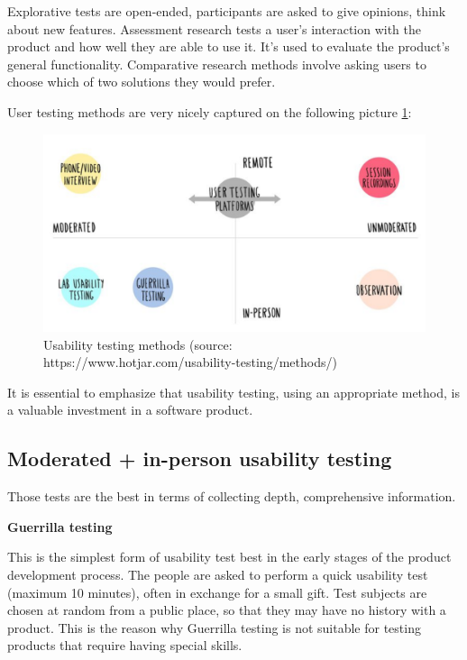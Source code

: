\documentclass[a4paper,10pt,twoside]{article}
\begin{document}
\noindent Explorative tests are open-ended, participants are asked to give opinions, think about new features. Assessment research tests a user's interaction with the product and how well they are able to use it. It's used to evaluate the product's general functionality. Comparative research methods involve asking users to choose which of two solutions they would prefer.

\noindent User testing methods are very nicely captured on the following picture \ref{fig:usability_testing_methods}:

\vspace{0.3cm}
\begin{figure}[hbt!] 
\begin{center}
\includegraphics[width=17cm]{../pictures/usability_testing_methods.png} 
\caption[Usability testing methods]{Usability testing methods (source: https://www.hotjar.com/usability-testing/methods/)}
\label{fig:usability_testing_methods}
\end{center}
\end{figure}

\noindent It is essential to emphasize that usability testing, using an appropriate method, is a valuable investment in a software product.

\subsection{Moderated + in-person usability testing}
Those tests are the best in terms of collecting depth, comprehensive information.
\smallskip

\noindent \textbf {Guerrilla testing}

\noindent This is the simplest form of usability test best in the early stages of the product development process. The people are asked to perform a quick usability test (maximum 10 minutes), often in exchange for a small gift. Test subjects are chosen at random from a public place, so that they may have no history with a product. This is the reason why Guerrilla testing is not suitable for testing products that require having special skills.
\end{document}
